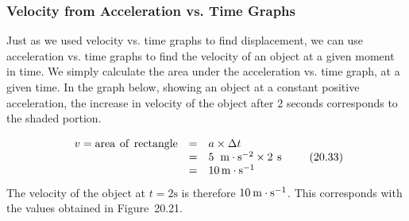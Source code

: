             \subsubsection{ Velocity from Acceleration vs. Time Graphs}
            \nopagebreak
          \label{m38795*id72754}Just as we used velocity vs. time graphs to find displacement, we can use acceleration vs. time graphs to find the velocity of an object at a given moment in time. We simply calculate the area under the acceleration vs. time graph, at a given time. In the graph below, showing an object at a constant positive acceleration, the increase in velocity of the object after 2 seconds corresponds to the shaded portion.\par 
          \label{m38795*id72760}\nopagebreak\noindent{}
            
    \begin{equation}
    \begin{array}{ccc}\hfill v=\mathrm{area}\phantom{\rule{4pt}{0ex}}\mathrm{of}\phantom{\rule{4pt}{0ex}}\mathrm{rectangle}& =& a\ensuremath{\times}\Delta t\hfill \\ & =& 5\phantom{\rule{4pt}{0ex}}\phantom{\rule{0.166667em}{0ex}}\mathrm{m}\ensuremath{\cdot}{\mathrm{s}}^{-2}\ensuremath{\times}2\phantom{\rule{4pt}{0ex}}\mathrm{s}\hfill \\ & =& 10\phantom{\rule{0.166667em}{0ex}}\mathrm{m}\ensuremath{\cdot}{\mathrm{s}}^{-1}\hfill \end{array}\tag{20.33}
      \end{equation}
          \label{m38795*id72897}The velocity of the object at $t=2\mathrm{s}$ is therefore $10\phantom{\rule{2pt}{0ex}}\mathrm{m}\ensuremath{\cdot}\mathrm{s}{}^{-1}$. This corresponds with the values obtained in Figure~20.21.\par 
    \label{m38795*cid8}
